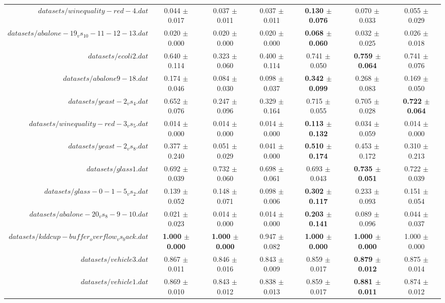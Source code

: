 \begin{table}[!ht]
{\begin{tabular}{r c c c c c c}
$datasets/winequality-red-4.dat$ & 0.044 $\pm$ 0.017 & 0.037 $\pm$ 0.011 & 0.037 $\pm$ 0.011 & \textbf{0.130 $\pm$ 0.076} & 0.070 $\pm$ 0.033 & 0.055 $\pm$ 0.029 \\
$datasets/abalone-19_vs_10-11-12-13.dat$ & 0.020 $\pm$ 0.000 & 0.020 $\pm$ 0.000 & 0.020 $\pm$ 0.000 & \textbf{0.068 $\pm$ 0.060} & 0.032 $\pm$ 0.025 & 0.026 $\pm$ 0.018 \\
$datasets/ecoli2.dat$ & 0.640 $\pm$ 0.114 & 0.323 $\pm$ 0.060 & 0.400 $\pm$ 0.114 & 0.741 $\pm$ 0.050 & \textbf{0.759 $\pm$ 0.064} & 0.741 $\pm$ 0.076 \\
$datasets/abalone9-18.dat$ & 0.174 $\pm$ 0.046 & 0.084 $\pm$ 0.030 & 0.098 $\pm$ 0.037 & \textbf{0.342 $\pm$ 0.099} & 0.268 $\pm$ 0.083 & 0.169 $\pm$ 0.050 \\
$datasets/yeast-2_vs_4.dat$ & 0.652 $\pm$ 0.076 & 0.247 $\pm$ 0.096 & 0.329 $\pm$ 0.164 & 0.715 $\pm$ 0.055 & 0.705 $\pm$ 0.028 & \textbf{0.722 $\pm$ 0.064} \\
$datasets/winequality-red-3_vs_5.dat$ & 0.014 $\pm$ 0.000 & 0.014 $\pm$ 0.000 & 0.014 $\pm$ 0.000 & \textbf{0.113 $\pm$ 0.132} & 0.034 $\pm$ 0.059 & 0.014 $\pm$ 0.000 \\
$datasets/yeast-2_vs_8.dat$ & 0.377 $\pm$ 0.240 & 0.051 $\pm$ 0.029 & 0.041 $\pm$ 0.000 & \textbf{0.510 $\pm$ 0.174} & 0.453 $\pm$ 0.172 & 0.310 $\pm$ 0.213 \\
$datasets/glass1.dat$ & 0.692 $\pm$ 0.039 & 0.732 $\pm$ 0.060 & 0.698 $\pm$ 0.061 & 0.693 $\pm$ 0.043 & \textbf{0.735 $\pm$ 0.051} & 0.722 $\pm$ 0.039 \\
$datasets/glass-0-1-5_vs_2.dat$ & 0.139 $\pm$ 0.052 & 0.148 $\pm$ 0.071 & 0.098 $\pm$ 0.006 & \textbf{0.302 $\pm$ 0.117} & 0.233 $\pm$ 0.093 & 0.151 $\pm$ 0.054 \\
$datasets/abalone-20_vs_8-9-10.dat$ & 0.021 $\pm$ 0.023 & 0.014 $\pm$ 0.000 & 0.014 $\pm$ 0.000 & \textbf{0.203 $\pm$ 0.141} & 0.089 $\pm$ 0.096 & 0.044 $\pm$ 0.037 \\
$datasets/kddcup-buffer_overflow_vs_back.dat$ & \textbf{1.000 $\pm$ 0.000} & \textbf{1.000 $\pm$ 0.000} & 0.947 $\pm$ 0.082 & \textbf{1.000 $\pm$ 0.000} & \textbf{1.000 $\pm$ 0.000} & 1.000 $\pm$ 0.000 \\
$datasets/vehicle3.dat$ & 0.867 $\pm$ 0.011 & 0.846 $\pm$ 0.016 & 0.843 $\pm$ 0.009 & 0.859 $\pm$ 0.017 & \textbf{0.879 $\pm$ 0.012} & 0.875 $\pm$ 0.014 \\
$datasets/vehicle1.dat$ & 0.869 $\pm$ 0.010 & 0.843 $\pm$ 0.012 & 0.838 $\pm$ 0.013 & 0.859 $\pm$ 0.017 & \textbf{0.881 $\pm$ 0.011} & 0.874 $\pm$ 0.012 \\

\end{tabular}}
\end{table}

